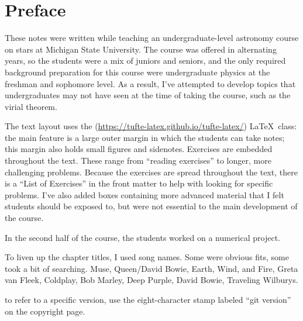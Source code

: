 
\section*{Preface}
These notes were written while teaching an undergraduate-level astronomy course on stars at Michigan State University. The course was offered in alternating years, so the students were a mix of juniors and seniors, and the only required background preparation for this course were undergraduate physics at the freshman and sophomore level. As a result, I've attempted to develop topics that undergraduates may not have seen at the time of taking the course, such as the virial theorem.

The text layout uses the  (\url{https://tufte-latex.github.io/tufte-latex/}) \LaTeX\ class:  the main feature is a large outer margin in which the students can take notes; this margin also holds small figures and sidenotes. Exercises are embedded throughout the text.  These range from ``reading exercises'' to longer, more challenging problems.  Because the exercises are spread throughout the text, there is a ``List of Exercises'' in the front matter to help with looking for specific problems. I've also added boxes containing more advanced material that I felt students should be exposed to, but were not essential to the main development of the course.

In the second half of the course, the students worked on a numerical project.

To liven up the chapter titles, I used song names. Some were obvious fits, some took a bit of searching. Muse, Queen/David Bowie, Earth, Wind, and Fire, Greta van Fleek, Coldplay, Bob Marley, Deep Purple, David Bowie, Traveling Wilburys.

 to refer to a specific version, use the eight-character stamp labeled ``git version'' on the copyright page.

